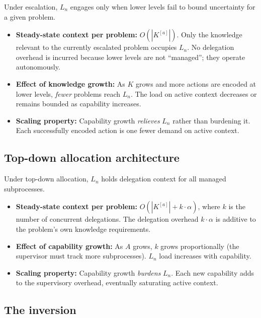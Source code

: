 \documentclass[11pt]{article}
\theoremstyle{definition}
\begin{document}
Under escalation, $L_n$ engages only when lower levels fail to bound
uncertainty for a given problem.

\begin{itemize}
\item \textbf{Steady-state context per problem:} $O(|K^{[a]}|)$.
   Only the knowledge relevant to the currently escalated problem
   occupies $L_n$. No delegation overhead is incurred because lower
   levels are not ``managed''; they operate autonomously.

\item \textbf{Effect of knowledge growth:} As $K$ grows and more
   actions are encoded at lower levels, \emph{fewer} problems reach
   $L_n$. The load on active context decreases or remains bounded as
   capability increases.

\item \textbf{Scaling property:} Capability growth \emph{relieves}
   $L_n$ rather than burdening it. Each successfully encoded action
   is one fewer demand on active context.
\end{itemize}

\subsection{Top-down allocation architecture}

Under top-down allocation, $L_n$ holds delegation context for all
managed subprocesses.

\begin{itemize}
\item \textbf{Steady-state context per problem:}
   $O(|K^{[a]}| + k \cdot \alpha)$, where $k$ is the number of
   concurrent delegations. The delegation overhead $k \cdot \alpha$
   is additive to the problem's own knowledge requirements.

\item \textbf{Effect of capability growth:} As $A$ grows, $k$ grows
   proportionally (the supervisor must track more subprocesses).
   $L_n$ load increases with capability.

\item \textbf{Scaling property:} Capability growth \emph{burdens}
   $L_n$. Each new capability adds to the supervisory overhead,
   eventually saturating active context.
\end{itemize}

\subsection{The inversion}
\end{document}

